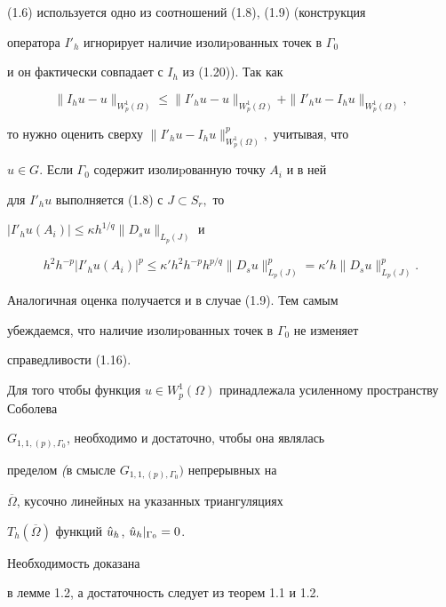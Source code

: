 \begin{pf}
(1.6) используется одно из соотношений (1.8), (1.9) (конструкция


оператора $I'_h$ игно\-рирует наличие изолиpованных точек в $\Gamma_0$


и он фактически совпа\-дает с $I_h$ из (1.20)). Так как


$$


\|I_hu-u\|_{W_p^1 (\Omega)}\le \|I'_hu-u\|_{W_p^1 (\Omega)}


+\|I'_hu-I_hu\|_{W_p^1 (\Omega)},


$$


то нужно оценить сверху $\|I'_hu-I_hu\|^p_{W_p^1 (\Omega)},$ учитывая, что


$u\in G.$ Если $\Gamma_0$ содержит изолиpованную точку $A_i$ и в ней


для $I'_hu$ выполняется (1.8) с $J\subset S_r,$ то


$|I'_hu(A_i)|\le \kappa h^{1/q}\|D_su\|_{L_p(J)}$ и


$$


h^2 h^{-p}|I'_hu(A_i)|^p\le \kappa'h^2h^{-p}h^{p/q}\|D_su\|^p_{L_p(J)}


=\kappa'h\|D_su\|^p_{L_p(J)}.


$$


Аналогичная оценка получается и в случае (1.9). Тем самым


убеждаемся, что наличие изолиpованных точек в $\Gamma_0$ не изменяет


справедливости (1.16).


\end{pf}





\begin{thmm} Для того чтобы функция $u\in


W_p^1(\Omega)$ принадлежала усиленному пространству Соболева


$G_{1,1,(p),\Gamma_0}$, нео\-бходимо и достаточно, чтобы она являлась


пределом {\em(}в смысле $G_{1,1,(p),\Gamma_0})$ непрерывных на


$\overline\Omega$, кусочно линейных на указан\-ных триангуляциях


$T_h(\overline\Omega)$ функций $\Hat u_h$, $\Hat u_h|_{\Gamma_0}=0$.


\end{thmm}





\begin{pf} Необходимость доказана


в лемме 1.2, а доста\-точность следует из теорем 1.1 и 1.2.


\end{pf}





